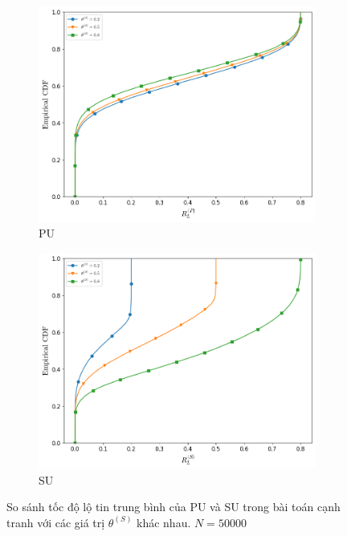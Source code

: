 \documentclass[../main.tex]{subfiles}
\begin{document}
\begin{figure}
\centering
\captionsetup{justification=centering}

\begin{subfigure}{.8\textwidth}
\centering
\captionsetup{justification=centering}
\includegraphics[width=1\linewidth]{Figures/thetas-rlp.png}
\caption{PU}
\label{fig:ThetaS:RLP}
\end{subfigure}

\begin{subfigure}{.8\textwidth}
\centering
\includegraphics[width=1\linewidth]{Figures/thetas-rls.png}
\caption{SU}
\label{fig:ThetaS:RLS}
\end{subfigure}

\caption{So sánh tốc độ lộ tin trung bình của PU và SU trong bài toán cạnh tranh với các giá trị $\theta^{(S)}$ khác nhau. $N=50000$}
\end{figure}
\end{document}
